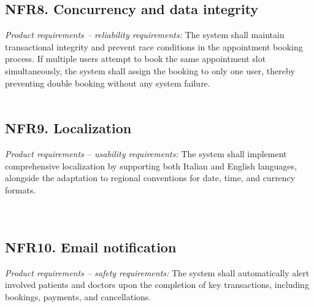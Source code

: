 \documentclass[12pt, a4paper]{article}
\begin{document}
\subsection{NFR8. Concurrency and data integrity} \label{NFR8}
    \textit{Product requirements -- reliability requirements:}
    The system shall maintain transactional integrity and prevent race conditions in the appointment booking process. If multiple users attempt to book the same appointment slot simultaneously, the system shall assign the booking to only one user, thereby preventing double booking without any system failure.
    \\ 
    \\ 
    

\subsection{NFR9. Localization} \label{NFR9}
\textit{Product requirements -- usability requirements:}
The system shall implement comprehensive localization by supporting both Italian and English languages, alongside the adaptation to regional conventions for date, time, and currency formats.
\\ 
\\ 
\\ 

\subsection{NFR10. Email notification}\label{NFR10}
\textit{Product requirements -- safety requirements:}
The system shall automatically alert involved patients and doctors upon the completion of key transactions, including bookings, payments, and cancellations. 
 \\ 
 \\ 
 \\ 
 \\ 
 \\ 
 \\ 
 \\ 
 
\end{document}
